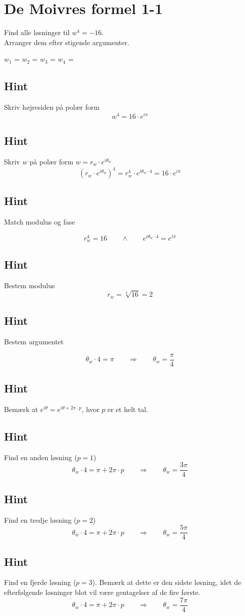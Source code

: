 \documentclass{article}
\newenvironment{exercise}[1]{\newpage\section{#1}}{}
\newcommand{\answerbox}[1]{\fbox{$#1$}}
\newcommand{\hint}{\subsection*{Hint}}
\begin{document}
\tableofcontents
\newpage

\begin{exercise}{De Moivres formel 1-1}

Find alle løsninger til $w^4=-16$. \\
Arranger dem efter stigende argumenter.

$w_1$ = \answerbox{2 \cdot e^{i \frac{\pi}{4}}}		$w_2$ = \answerbox{2 \cdot e^{i \frac{3 \pi}{4}}}		$w_3$ = \answerbox{2 \cdot e^{i \frac{5 \pi}{4}}}		$w_4$ = \answerbox{2 \cdot e^{i \frac{7 \pi}{4}}}


\hint 

Skriv højresiden på polær form
\[
w^4 = 16 \cdot e^{i \pi}
\]


\hint

Skriv $w$ på polær form $w = r_w \cdot e^{i \theta_w}$
\[
\left(r_w \cdot e^{i \theta_w}\right)^4 = r_w^4 \cdot e^{i \theta_w \cdot 4} = 16 \cdot e^{i \pi}
\]

\hint 
Match modulus og fase

\[
r_w^4 = 16 \qquad \wedge \qquad e^{i \theta_w \cdot 4} = e^{i \pi}
\]

\hint

Bestem modulus
\[
r_w  =  \sqrt[4]{16} = 2
\]

\hint

Bestem argumentet

\[
\theta_w \cdot 4 = \pi \qquad \Rightarrow \qquad  \theta_w = \frac{\pi}{4}
\]

\hint

Bemærk at $e^{i \theta} = e^{i \theta + 2 \pi \cdot p}$, hvor $p$ er et helt tal.

\hint

Find en anden løsning ($p=1$)
\[
\theta_w \cdot 4 = \pi  + 2 \pi \cdot p \qquad \Rightarrow \qquad  \theta_w = \frac{3 \pi}{4}
\]

\hint

Find en tredje løsning ($p=2$)
\[
\theta_w \cdot 4 = \pi  + 2 \pi \cdot p \qquad \Rightarrow  \qquad  \theta_w = \frac{5 \pi}{4}
\]

\hint

Find en fjerde løsning ($p=3$). Bemærk at dette er den sidste løsning, idet de efterfølgende løsninger blot vil være gentagelser af de fire første. 
\[
\theta_w \cdot 4 = \pi  + 2 \pi \cdot p \qquad \Rightarrow  \qquad  \theta_w = \frac{7 \pi}{4}
\]

\end{exercise}

\newpage
\end{document}
